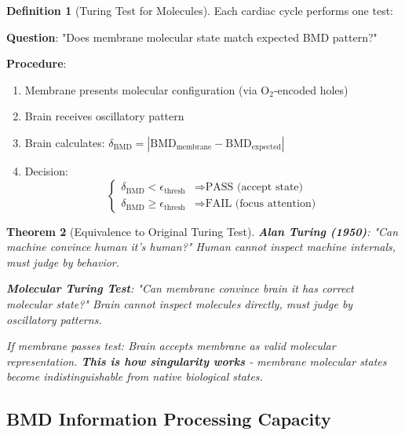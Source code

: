 \documentclass[11pt,a4paper]{article}
\newtheorem{theorem}{Theorem}[section]
\theoremstyle{definition}
\newtheorem{definition}[theorem]{Definition}
\theoremstyle{remark}
\begin{document}
\begin{definition}[Turing Test for Molecules]
Each cardiac cycle performs one test:

\textbf{Question}: "Does membrane molecular state match expected BMD pattern?"

\textbf{Procedure}:
\begin{enumerate}
\item Membrane presents molecular configuration (via O$_2$-encoded holes)
\item Brain receives oscillatory pattern
\item Brain calculates: $\delta_{\text{BMD}} = |\text{BMD}_{\text{membrane}} - \text{BMD}_{\text{expected}}|$
\item Decision:
\begin{equation}
\begin{cases}
\delta_{\text{BMD}} < \epsilon_{\text{thresh}} & \Rightarrow \text{PASS (accept state)} \\
\delta_{\text{BMD}} \geq \epsilon_{\text{thresh}} & \Rightarrow \text{FAIL (focus attention)}
\end{cases}
\end{equation}
\end{enumerate}
\end{definition}

\begin{theorem}[Equivalence to Original Turing Test]
\textbf{Alan Turing (1950)}: "Can machine convince human it's human?" Human cannot inspect machine internals, must judge by behavior.

\textbf{Molecular Turing Test}: "Can membrane convince brain it has correct molecular state?" Brain cannot inspect molecules directly, must judge by oscillatory patterns.

If membrane passes test: Brain accepts membrane as valid molecular representation. \textbf{This is how singularity works} - membrane molecular states become indistinguishable from native biological states.
\end{theorem}

\subsection{BMD Information Processing Capacity}
\end{document}
